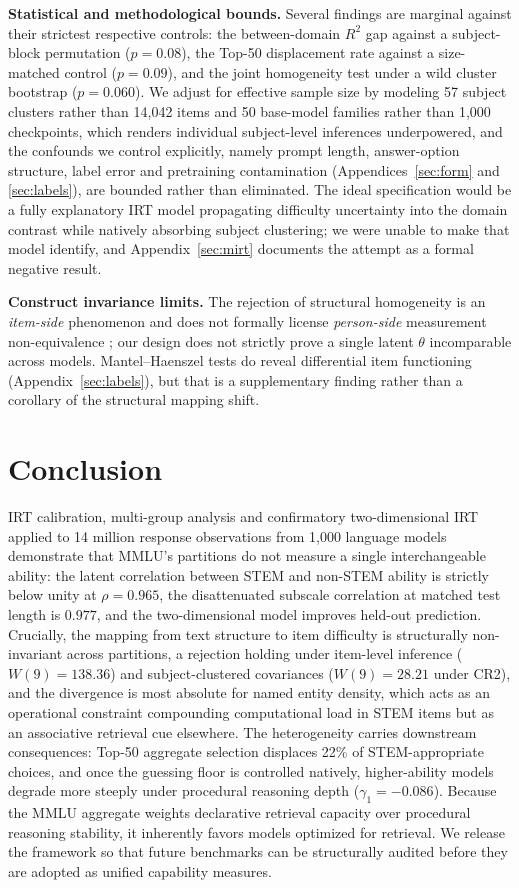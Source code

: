 \textbf{Statistical and methodological bounds.} Several findings are marginal against their strictest respective controls: the between-domain $R^{2}$ gap against a subject-block permutation ($p = 0.08$), the Top-50 displacement rate against a size-matched control ($p = 0.09$), and the joint homogeneity test under a wild cluster bootstrap ($p = 0.060$). We adjust for effective sample size by modeling 57 subject clusters rather than 14,042 items and 50 base-model families rather than 1,000 checkpoints, which renders individual subject-level inferences underpowered, and the confounds we control explicitly, namely prompt length, answer-option structure, label error and pretraining contamination (Appendices~\ref{sec:form} and \ref{sec:labels}), are bounded rather than eliminated. The ideal specification would be a fully explanatory IRT model propagating difficulty uncertainty into the domain contrast while natively absorbing subject clustering; we were unable to make that model identify, and Appendix~\ref{sec:mirt} documents the attempt as a formal negative result.

\textbf{Construct invariance limits.} The rejection of structural homogeneity is an \emph{item-side} phenomenon and does not formally license \emph{person-side} measurement non-equivalence \citep{meredith1993}; our design does not strictly prove a single latent $\theta$ incomparable across models. Mantel--Haenszel tests do reveal differential item functioning (Appendix~\ref{sec:labels}), but that is a supplementary finding rather than a corollary of the structural mapping shift.

\section{Conclusion}\label{conclusion}

IRT calibration, multi-group analysis and confirmatory two-dimensional IRT applied to 14 million response observations from 1,000 language models demonstrate that MMLU's partitions do not measure a single interchangeable ability: the latent correlation between STEM and non-STEM ability is strictly below unity at $\rho = 0.965$, the disattenuated subscale correlation at matched test length is $0.977$, and the two-dimensional model improves held-out prediction. Crucially, the mapping from text structure to item difficulty is structurally non-invariant across partitions, a rejection holding under item-level inference ($W(9) = 138.36$) and subject-clustered covariances ($W(9) = 28.21$ under CR2), and the divergence is most absolute for named entity density, which acts as an operational constraint compounding computational load in STEM items but as an associative retrieval cue elsewhere. The heterogeneity carries downstream consequences: Top-50 aggregate selection displaces 22\% of STEM-appropriate choices, and once the guessing floor is controlled natively, higher-ability models degrade more steeply under procedural reasoning depth ($\gamma_{1} = -0.086$). Because the MMLU aggregate weights declarative retrieval capacity over procedural reasoning stability, it inherently favors models optimized for retrieval. We release the framework so that future benchmarks can be structurally audited before they are adopted as unified capability measures.

